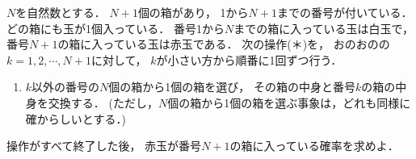 \documentclass[../../main.tex]{subfiles}
\begin{document}
$N$を自然数とする．
$N+1$個の箱があり，
1から$N+1$までの番号が付いている．
どの箱にも玉が1個入っている．
番号1から$N$までの箱に入っている玉は白玉で，
番号$N+1$の箱に入っている玉は赤玉である．
次の操作(＊)を，
おのおのの$k=1,2,\cdots,N+1$に対して，
$k$が小さい方から順番に1回ずつ行う．
\begin{enumerate}
  \item[(＊)]$k$以外の番号の$N$個の箱から1個の箱を選び，
    その箱の中身と番号$k$の箱の中身を交換する．
    (ただし，$N$個の箱から1個の箱を選ぶ事象は，どれも同様に確からしいとする．)
\end{enumerate}
操作がすべて終了した後，
赤玉が番号$N+1$の箱に入っている確率を求めよ．
\end{document}
